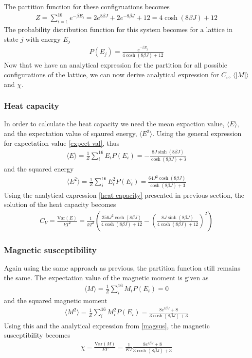 \documentclass[a4paper, 10pt]{article}
\begin{document}
The partition function for these configruations becomes
\begin{align}
  Z = \sum_{i = 1}^{16}e^{-\beta E_{i}} = 2e^{8\beta J} + 2e^{-8\beta J} + 12 = 4\cosh{\left(8\beta J\right)} + 12
\end{align}
The probability distribution function for this system becomes for a lattice in state $j$ with energy $E_{j}$
\begin{align}
  P(E_{j}) = \frac{e^{-\beta E_{j}}}{4\cosh{\left(8\beta J\right)} + 12}
\end{align}
Now that we have an analytical expression for the partition for all possible configurations
of the lattice, we can now derive analytical expression for $C_{v}$, $\langle |M|\rangle$ and $\chi$.
\subsubsection{Heat capacity}
In order to calculate the heat capacity we need the mean expaction value, $\langle E \rangle$,
and the expectation value of sqaured energy, $\langle E^2 \rangle$. Using the general expression for expectation value
\eqref{expect val}, thus
\begin{align}
  \langle E \rangle = \frac{1}{Z}\sum_{i}^{16}E_{i}P(E_{i}) = -\frac{8J\sinh{(8\beta J)}}{\cosh{\left(8\beta J\right)} + 3}
\end{align}
and the squared energy
\begin{align}
  \langle E^{2} \rangle = \frac{1}{Z}\sum_{i}^{16}E^{2}_{i}P(E_{i}) = \frac{64J^{2}\cosh{(8\beta J)}}{\cosh{\left(8\beta J\right)} + 3}
\end{align}
Using the analytical expression \eqref{heat capacity} presented in previous section, the solution of the heat capacity
becomes
\begin{align}
  C_{V} = \frac{\mathrm{Var}(E)}{kT^{2}} =\frac{1}{kT^{2}} \left(
  \frac{256J^{2}\cosh{(8\beta J)}}{4\cosh{\left(8\beta J\right)} + 12} -
  \left(\frac{8J\sinh{(8\beta J)}}{4\cosh{\left(8\beta J\right)} + 12}\right)^{2}
  \right)
\end{align}
\subsubsection{Magnetic susceptibility} Again using the same approach as previous, the partition function
still remains the same. The expectation value of the magnetic moment is given as
\begin{align}
  \langle M \rangle = \frac{1}{Z}\sum_{i}^{16}M_{i}P(E_{i}) = 0
\end{align}
and the squared magnetic moment
\begin{align}
  \langle M^{2} \rangle = \frac{1}{Z}\sum_{i}^{16}M^{2}_{i}P(E_{i}) = \frac{8e^{8\beta J} + 8}{3\cosh{\left(8\beta J\right)} + 3}
\end{align}
Using this and the analytical expression from \eqref{magsus}, the magnetic susceptibility becomes
\begin{align}
  \chi  = \frac{\mathrm{Var}(M)}{kT} = \frac{1}{KT}\frac{8e^{8\beta J} + 8}{3\cosh{\left(8\beta J\right)} + 3}
\end{align}
\end{document}
